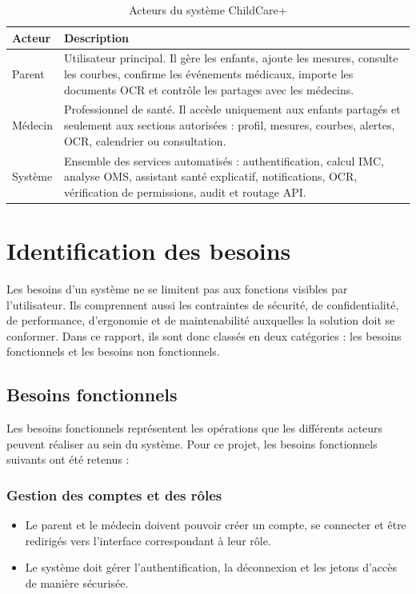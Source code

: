 \begin{table}[htbp]
\centering
\caption{Acteurs du système ChildCare+}
\label{tab:acteurs}
\begin{tabularx}{\textwidth}{|l|X|}
\hline
\textbf{Acteur} & \textbf{Description} \\
\hline
Parent & Utilisateur principal. Il gère les enfants, ajoute les mesures, consulte les courbes, confirme les événements médicaux, importe les documents OCR et contrôle les partages avec les médecins. \\
\hline
Médecin & Professionnel de santé. Il accède uniquement aux enfants partagés et seulement aux sections autorisées : profil, mesures, courbes, alertes, OCR, calendrier ou consultation. \\
\hline
Système & Ensemble des services automatisés : authentification, calcul IMC, analyse OMS, assistant santé explicatif, notifications, OCR, vérification de permissions, audit et routage API. \\
\hline
\end{tabularx}
\end{table}

\section{Identification des besoins}
\label{sec:besoins}

Les besoins d'un système ne se limitent pas aux fonctions visibles par
l'utilisateur. Ils comprennent aussi les contraintes de sécurité, de
confidentialité, de performance, d'ergonomie et de maintenabilité auxquelles la
solution doit se conformer. Dans ce rapport, ils sont donc classés en deux
catégories : les besoins fonctionnels et les besoins non fonctionnels.

\subsection{Besoins fonctionnels}
\label{sec:besoins-fonctionnels}

Les besoins fonctionnels représentent les opérations que les différents acteurs peuvent réaliser au sein du système. Pour ce projet, les besoins fonctionnels suivants ont été retenus :

\subsubsection*{Gestion des comptes et des rôles}
\begin{itemize}
    \item Le parent et le médecin doivent pouvoir créer un compte, se connecter et être redirigés vers l'interface correspondant à leur rôle.
    \item Le système doit gérer l'authentification, la déconnexion et les jetons d'accès de manière sécurisée.
\end{itemize}

